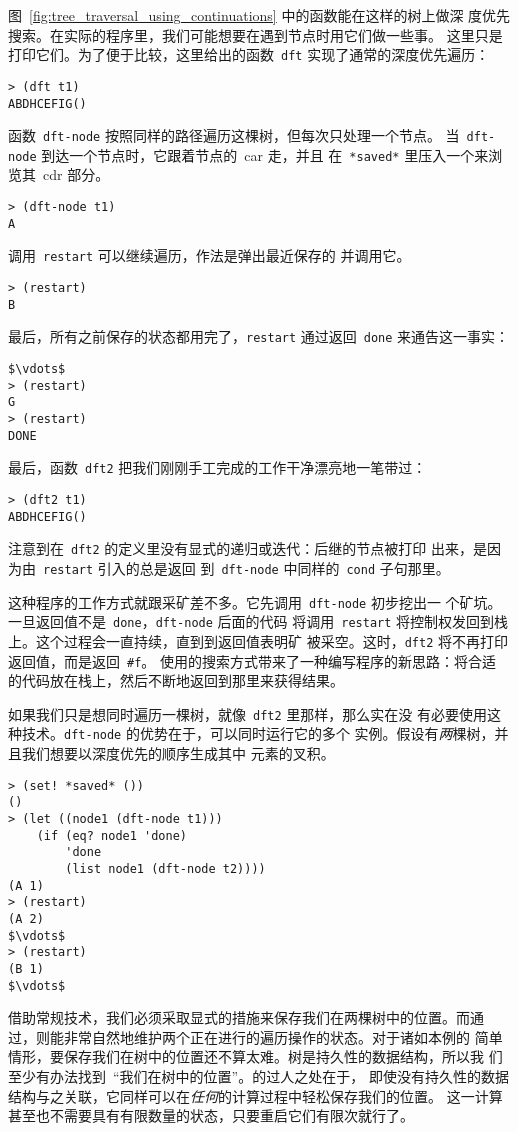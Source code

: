 图~\ref{fig:tree_traversal_using_continuations} 中的函数能在这样的树上做深
度优先搜索。在实际的程序里，我们可能想要在遇到节点时用它们做一些事。
这里只是打印它们。为了便于比较，这里给出的函数~\texttt{dft} 
实现了通常的深度优先遍历：
\begin{lstlisting}
> (dft t1)
ABDHCEFIG()
\end{lstlisting}
函数~\texttt{dft-node} 按照同样的路径遍历这棵树，但每次只处理一个节点。
当~\texttt{dft-node} 到达一个节点时，它跟着节点的~car 走，并且
在~\texttt{*saved*} 里压入一个\continuation{}来浏览其~cdr 部分。
\begin{lstlisting}
> (dft-node t1)
A
\end{lstlisting}
调用~\texttt{restart} 可以继续遍历，作法是弹出最近保存的
\continuation{}并调用它。
\begin{lstlisting}
> (restart)
B
\end{lstlisting}
最后，所有之前保存的状态都用完了，\texttt{restart} 通过返回~\texttt{done}
来通告这一事实：
\begin{lstlisting}
$\vdots$
> (restart)
G
> (restart)
DONE
\end{lstlisting}

最后，函数~\texttt{dft2} 把我们刚刚手工完成的工作干净漂亮地一笔带过：
\begin{lstlisting}
> (dft2 t1)
ABDHCEFIG()
\end{lstlisting}
注意到在~\texttt{dft2} 的定义里没有显式的递归或迭代：后继的节点被打印
出来，是因为由~\texttt{restart} 引入的\continuation{}总是返回
到~\texttt{dft-node} 中同样的~\texttt{cond} 子句那里。

这种程序的工作方式就跟采矿差不多。它先调用~\texttt{dft-node} 初步挖出一
个矿坑。一旦返回值不是~\texttt{done}，\texttt{dft-node} 后面的代码
将调用~\texttt{restart} 将控制权发回到栈上。这个过程会一直持续，直到到返回值表明矿
被采空。这时，\texttt{dft2} 将不再打印返回值，而是返回~\verb|#f|。
使用\continuation{}的搜索方式带来了一种编写程序的新思路：将合适
的代码放在栈上，然后不断地返回到那里来获得结果。

如果我们只是想同时遍历一棵树，就像~\texttt{dft2} 里那样，那么实在没
有必要使用这种技术。\texttt{dft-node} 的优势在于，可以同时运行它的多个
实例。假设有\emph{两}棵树，并且我们想要以深度优先的顺序生成其中
元素的叉积。
\begin{lstlisting}
> (set! *saved* ())
()
> (let ((node1 (dft-node t1)))
    (if (eq? node1 'done)
        'done
        (list node1 (dft-node t2))))
(A 1)
> (restart)
(A 2)
$\vdots$
> (restart)
(B 1)
$\vdots$
\end{lstlisting}
借助常规技术，我们必须采取显式的措施来保存我们在两棵树中的位置。而通
过\continuation{}，则能非常自然地维护两个正在进行的遍历操作的状态。对于诸如本例的
简单情形，要保存我们在树中的位置还不算太难。树是持久性的数据结构，所以我
们至少有办法找到~``我们在树中的位置''。\continuation{}的过人之处在于，
即使没有持久性的数据结构与之关联，它同样可以在\emph{任何}的计算过程中轻松保存我们的位置。
这一计算甚至也不需要具有有限数量的状态，只要重启它们有限次就行了。


